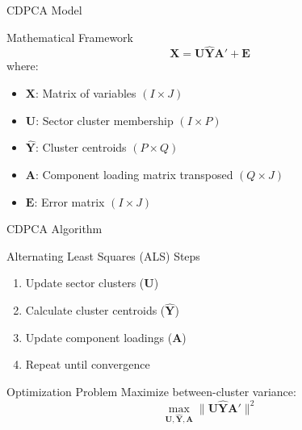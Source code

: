 \documentclass{beamer}
\begin{document}
\begin{frame}{CDPCA Model}
    \begin{block}{Mathematical Framework}
        \begin{equation*}
            \mathbf{X} = \mathbf{U}\hat{\mathbf{Y}}\mathbf{A}' + \mathbf{E}
        \end{equation*}
        where:
        \begin{itemize}
        \item $\mathbf{X}$: Matrix of variables $(I \times J)$
        \item $\mathbf{U}$: Sector cluster membership $(I \times P)$
        \item $\hat{\mathbf{Y}}$: Cluster centroids $(P \times Q)$
        \item $\mathbf{A}$: Component loading matrix transposed $(Q \times J)$
        \item $\mathbf{E}$: Error matrix $(I \times J)$
        \end{itemize}
    \end{block}
\end{frame}

\begin{frame}{CDPCA Algorithm}
    \begin{block}{Alternating Least Squares (ALS) Steps}
    \begin{enumerate}
        \item Update sector clusters ($\mathbf{U}$)
        \item Calculate cluster centroids ($\hat{\mathbf{Y}}$)
        \item Update component loadings ($\mathbf{A}$)
        \item Repeat until convergence
    \end{enumerate}
    \end{block}

    \begin{block}{Optimization Problem}
        Maximize between-cluster variance:
        \begin{equation*}
            \max_{\mathbf{U},\hat{\mathbf{Y}},\mathbf{A}} \|\mathbf{U}\hat{\mathbf{Y}}\mathbf{A}'\|^2
        \end{equation*}
    \end{block}
\end{frame}
\end{document}
